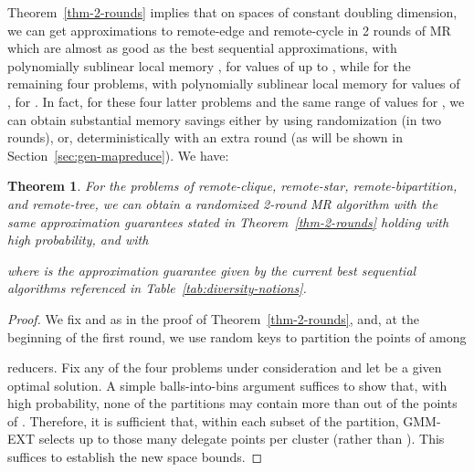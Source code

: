 \documentclass{article}
\newtheorem{theorem}{Theorem}
\begin{document}
Theorem~\ref{thm-2-rounds} implies that on spaces of constant doubling
dimension, we can get approximations to remote-edge and remote-cycle
in 2 rounds of MR which are almost as good as the best sequential
approximations, with polynomially sublinear local memory
, for values of  up to , while
for the remaining four problems, with polynomially sublinear local
memory  for values of ,
for . In fact, for these four latter problems and the
same range of values for , we can obtain substantial memory savings
either by using randomization (in two rounds), or, deterministically
with an extra round (as will be shown in
Section~\ref{sec:gen-mapreduce}). We have:
\begin{theorem}\label{thm-2-rounds-rand}
  For the problems of remote-clique, remote-star, remote-bipartition,
  and remote-tree, we can obtain a randomized 2-round MR algorithm
  with the same approximation guarantees stated in
  Theorem~\ref{thm-2-rounds} holding with high probability, and with
 
where  is the approximation guarantee given by the current
best sequential algorithms referenced in
Table~\ref{tab:diversity-notions}.
\end{theorem}
\begin{proof}
  We fix  and  as in the proof of
  Theorem~\ref{thm-2-rounds}, and, at the beginning of the first
  round, we use random keys to partition the  points of  among
  
  reducers. Fix
  any of the four problems under consideration and let  be a given
  optimal solution. A simple balls-into-bins argument suffices to show
  that, with high probability, none of the  partitions may
  contain more than  out of the 
  points of .  Therefore, it is sufficient that, within each subset
  of the partition, {\sc GMM-EXT} selects up to those many delegate
  points per cluster (rather than ).  This suffices to establish
  the new space bounds.
\end{proof}
\end{document}
